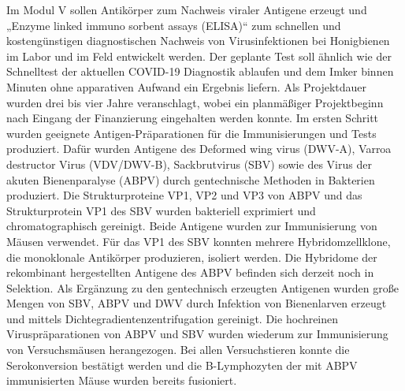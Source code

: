 Im Modul V sollen Antikörper zum Nachweis viraler Antigene erzeugt und „Enzyme linked immuno sorbent assays (ELISA)“ zum schnellen und kostengünstigen diagnostischen Nachweis von Virusinfektionen bei Honigbienen im Labor und im Feld entwickelt werden. Der geplante Test soll ähnlich wie der Schnelltest der aktuellen COVID-19 Diagnostik  ablaufen und dem Imker binnen Minuten ohne apparativen Aufwand ein Ergebnis liefern. Als Projektdauer wurden drei bis vier Jahre veranschlagt, wobei ein planmäßiger Projektbeginn nach Eingang der Finanzierung eingehalten werden konnte. Im ersten Schritt wurden geeignete Antigen-Präparationen für die Immunisierungen und Tests produziert. Dafür wurden Antigene des Deformed wing virus (DWV-A), Varroa destructor Virus (VDV/DWV-B), Sackbrutvirus (SBV) sowie des Virus der akuten Bienenparalyse (ABPV) durch gentechnische Methoden in Bakterien produziert. Die Strukturproteine VP1, VP2 und VP3 von ABPV und das Strukturprotein VP1 des SBV wurden bakteriell exprimiert und chromatographisch gereinigt. Beide Antigene wurden zur Immunisierung von Mäusen verwendet. Für das VP1 des SBV konnten mehrere Hybridomzellklone, die monoklonale Antikörper produzieren, isoliert werden. Die Hybridome der rekombinant hergestellten Antigene des ABPV befinden sich derzeit noch in Selektion. Als Ergänzung zu den gentechnisch erzeugten Antigenen wurden große Mengen von SBV, ABPV und DWV durch Infektion von Bienenlarven erzeugt und mittels Dichtegradientenzentrifugation gereinigt. Die hochreinen Viruspräparationen von ABPV und SBV wurden wiederum zur Immunisierung von Versuchsmäusen herangezogen. Bei allen Versuchstieren konnte die Serokonversion bestätigt werden und die B-Lymphozyten der mit ABPV immunisierten Mäuse wurden bereits fusioniert.